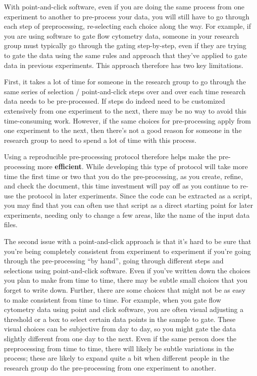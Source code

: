 \documentclass[]{tufte-book}
\begin{document}
With point-and-click software, even if you are doing the same process from one
experiment to another to pre-process your data, you will still have to go through
each step of preprocessing, re-selecting each choice along the way. For example,
if you are using software to gate flow cytometry data, someone in your research
group must typically go through the gating step-by-step, even if they are trying to
gate the data using the same rules and approach that they've applied to gate data
in previous experiments. This approach therefore has two key limitations.

First, it takes a lot of time for someone in the research group to go through
the same series of selection / point-and-click steps over and over each time
research data needs to be pre-processed. If steps do indeed need to be
customized extensively from one experiment to the next, there may be no way to
avoid this time-consuming work. However, if the same choices for pre-processing
apply from one experiment to the next, then there's not a good reason for
someone in the research group to need to spend a lot of time with this process.

Using a reproducible pre-processing protocol therefore helps make the
pre-processing more \textbf{efficient}. While developing this type of protocol will
take more time the first time or two that you do the pre-processing, as you
create, refine, and check the document, this time investment will pay off as you
continue to re-use the protocol in later experiments. Since the code can be
extracted as a script, you may find that you can often use that script as a
direct starting point for later experiments, needing only to change a few areas,
like the name of the input data files.

The second issue with a point-and-click approach is that it's hard to be sure
that you're being completely consistent from experiment to experiment if you're
going through the pre-processing ``by hand'', going through different steps and
selections using point-and-click software. Even if you've written down the
choices you plan to make from time to time, there may be subtle small choices
that you forget to write down. Further, there are some choices that might not be
as easy to make consistent from time to time. For example, when you gate flow
cytometry data using point and click software, you are often visual adjusting a
threshold or a box to select certain data points in the sample to gate. These
visual choices can be subjective from day to day, so you might gate the data
slightly different from one day to the next. Even if the same person does the
preprocessing from time to time, there will likely be subtle variations in the
process; these are likely to expand quite a bit when different people in the
research group do the pre-processing from one experiment to another.
\end{document}
